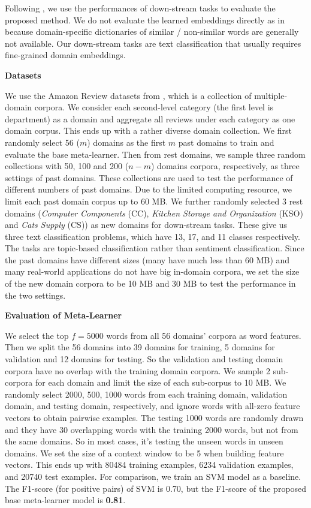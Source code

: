 Following \cite{nayak2016evaluating},
we use the performances of down-stream tasks to evaluate the proposed method. 
We do not evaluate the learned embeddings directly as in \cite{mikolov2013distributed,pennington2014glove} because domain-specific dictionaries of similar / non-similar words are generally not available. Our down-stream tasks are text classification that usually requires fine-grained domain embeddings.

\textbf{Datasets}

We use the Amazon Review datasets from \cite{HeMcA16a}, which is a collection of multiple-domain corpora. We consider each second-level category (the first level is department) as a domain and aggregate all reviews under each category as one domain corpus. This ends up with a rather diverse domain collection. 
We first randomly select 56 ($m$) domains as the first $m$ past domains to train and evaluate the base meta-learner.
Then from rest domains, we sample three random collections with 50, 100 and 200 ($n-m$) domains corpora, respectively, as three settings of past domains.
These collections are used to test the performance of different numbers of past domains.
Due to the limited computing resource, we limit each past domain corpus up to 60 MB.
We further randomly selected 3 rest domains (\emph{Computer Components} (CC), \emph{Kitchen Storage and Organization} (KSO) and \emph{Cats Supply} (CS)) as new domains for down-stream tasks. These give us three text classification problems, which have 13, 17, and 11 classes respectively. The tasks are topic-based classification rather than sentiment classification. 
Since the past domains have different sizes (many have much less than 60 MB) and many real-world applications do not have big in-domain corpora, we set the size of the new domain corpora to be 10 MB and 30 MB to test the performance in the two settings.

\textbf{Evaluation of Meta-Learner}

We select the top $f=5000$ words from all 56 domains' corpora as word features.
Then we split the 56 domains into 39 domains for training, 5 domains for validation and 12 domains for testing.
So the validation and testing domain corpora have no overlap with the training domain corpora.
We sample 2 sub-corpora for each domain and limit the size of each sub-corpus to 10 MB. We randomly select 2000, 500, 1000 words from each training domain, validation domain, and testing domain, respectively, and ignore words with all-zero feature vectors to obtain pairwise examples. 
The testing 1000 words are randomly drawn and they have 30 overlapping words with the training 2000 words, but not from the same domains. So in most cases, it's testing the unseen words in unseen domains.
We set the size of a context window to be 5 when building feature vectors.
This ends up with 80484 training examples, 6234 validation examples, and 20740 test examples.
For comparison, we train an SVM model as a baseline.
The F1-score (for positive pairs) of SVM is 0.70, but the F1-score of the proposed base meta-learner model is \textbf{0.81}.

